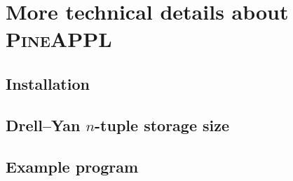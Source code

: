 \section{More technical details about \texorpdfstring{\textsc{PineAPPL}}{PineAPPL}}

\subsection{Installation}
\label{app:installation}

\subsection{Drell--Yan \texorpdfstring{$n$}{n}-tuple storage size}
\label{app:drell-yan-storage}

\subsection{Example program}
\label{app:example-program}


